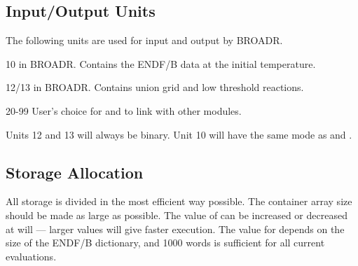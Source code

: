 \subsection{Input/Output Units}
\label{ssBROADR_IOunits}

The following units are used for input and output by BROADR.
\begin{list}{}{\leftmargin=.75in=.25in=.5in}
\begin{singlespace}

\item[10]     in BROADR.  Contains the ENDF/B data at the
             initial temperature.
\item[12/13]  in BROADR.  Contains union grid and
             low threshold reactions.
\item[20-99] User's choice for  and  to link with
             other modules.

\end{singlespace}
\end{list}

\noindent
Units 12 and 13 will always be binary.  Unit 10 will have the
same mode as  and .

\subsection{Storage Allocation}
\label{ssBROADR_storage}

All storage is divided in the most efficient way possible.  The
container array size  should be made as large as possible.
The value of  can be increased or decreased at will --- larger
values will give faster execution.  The value for  depends
on the size of the ENDF/B dictionary, and 1000 words is sufficient for
all current evaluations.

\cleardoublepage

